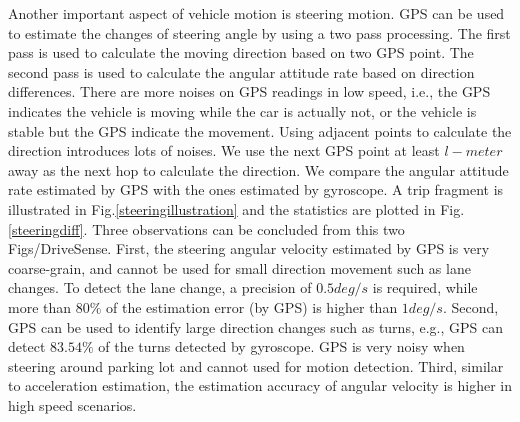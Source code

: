 {Another important aspect of vehicle motion is steering motion. 
GPS can be used to estimate the changes of steering angle
by using a two pass processing. 
The first pass is used to calculate the moving direction
based on two GPS point. 
The second pass is used to calculate the angular attitude
rate based on direction differences. 
There are more noises on GPS readings
in low speed, i.e., the GPS indicates the vehicle is 
moving while the car is actually not, or the vehicle is stable but the GPS indicate the movement. 
Using adjacent points to calculate the direction introduces
lots of noises. 
We use the next GPS point at least $l-meter$ 
away as the next hop to calculate the direction. 
We compare the angular attitude rate estimated by GPS with
the ones estimated by 
gyroscope.
A trip fragment is illustrated in Fig.\ref{steeringillustration}
and the statistics are plotted in Fig. \ref{steeringdiff}.
Three observations can be concluded from this two Figs/DriveSense. 
First, the steering angular velocity estimated by GPS
is very coarse-grain, and cannot be used
for small direction movement such as lane changes. 
To detect the lane change, a precision of $0.5deg/s$ 
is required, while more than $80\%$ of the 
estimation error (by GPS) is higher than $1deg/s$.
Second, GPS can be used to identify large direction
changes such as turns, e.g., GPS can detect $83.54\%$
of the turns detected by gyroscope. 
GPS is very noisy when steering around parking lot
and cannot used for motion detection. 
Third, similar to acceleration estimation, 
the estimation accuracy of angular velocity is higher 
in high speed scenarios. 
}



